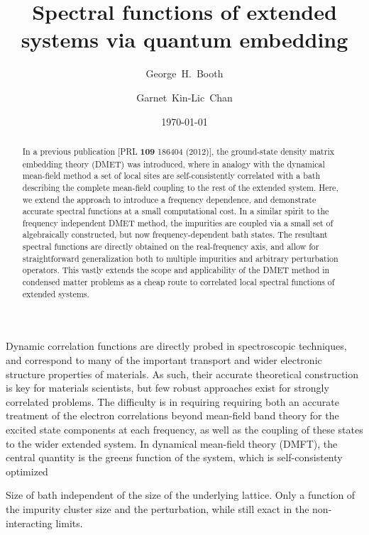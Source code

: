 \documentclass[aps,showpacs,twocolumn,nobibnotes]{revtex4}
\begin{document}
\title{Spectral functions of extended systems via quantum embedding}
\author{George~H.~Booth}
\author{Garnet~Kin-Lic~Chan}  

\begin{abstract}
In a previous publication [PRL {\bf 109} 186404 (2012)], the ground-state density matrix embedding theory (DMET) was introduced, where in analogy with the dynamical mean-field method a 
set of local sites are self-consistently correlated with a bath describing the complete mean-field coupling to the rest of the extended system. Here, we extend the approach to introduce 
a frequency dependence, and demonstrate accurate spectral functions at a small 
computational cost. In a similar spirit to the frequency independent DMET method, the impurities are coupled via a small set of algebraically constructed, but now 
frequency-dependent bath states. The resultant spectral functions are directly obtained on the real-frequency axis, and allow for straightforward generalization both to 
multiple impurities and arbitrary perturbation operators. This vastly extends the scope and applicability of the DMET method in condensed matter problems as a 
cheap route to correlated local spectral functions of extended systems.
\end{abstract}
\date{\today}
\maketitle

Dynamic correlation functions are directly probed in spectroscopic techniques, and correspond to many of the important transport and wider electronic structure 
properties of materials. As such, their accurate theoretical construction is key for materials scientists, but few robust approaches exist for strongly correlated problems.
The difficulty is in requiring requiring both an accurate treatment of the electron correlations beyond mean-field band theory for the excited state components at each frequency, 
as well as the coupling of these states to the wider extended system. In dynamical mean-field theory (DMFT), the central quantity is the greens function of the system, which is
self-consistenty optimized 

Size of bath independent of the size of the underlying lattice. Only a function of the impurity cluster size and the perturbation, while still exact in the non-interacting limits.

%
\end{document}
